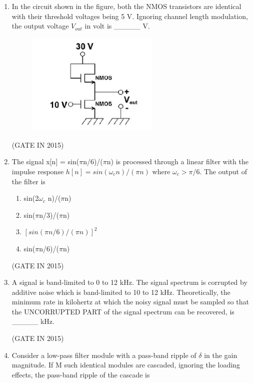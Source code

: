 \documentclass[journal]{IEEEtran}
\begin{document}
\begin{enumerate}
\item In the circuit shown in the figure, both the NMOS transistors are identical with their threshold voltages being 5 V. Ignoring channel length modulation, the output voltage $V_{out}$ in volt is \_\_\_\_\_ V.
\begin{figure}[H]
    \centering
      \includegraphics[width=0.6\textwidth]{28.png} 
      \caption{}
    \label{fig:fig28} 
\end{figure}
 \hfill(GATE IN 2015)

\item The signal x[n] = sin($\pi$n/6)/($\pi$n) is processed through a linear filter with the impulse response $h[n] = sin(\omega_c n)/(\pi n)$ where $\omega_c > \pi/6$. The output of the filter is

\begin{multicols}{2}
\begin{enumerate}
\item sin(2$\omega_c$ n)/($\pi$n)
\item sin($\pi$n/3)/($\pi$n)
\item $[sin(\pi n/6)/(\pi n)]^2$
\item sin($\pi$n/6)/($\pi$n)
\end{enumerate}
  \end{multicols} \hfill(GATE IN 2015)

\item A signal is band-limited to 0 to 12 kHz. The signal spectrum is corrupted by additive noise which is band-limited to 10 to 12 kHz. Theoretically, the minimum rate in kilohertz at which the noisy signal must be sampled so that the UNCORRUPTED PART of the signal spectrum can be recovered, is \_\_\_\_\_ kHz.

 \hfill(GATE IN 2015)

\item Consider a low-pass filter module with a pass-band ripple of $\delta$ in the gain magnitude. If M such identical modules are cascaded, ignoring the loading effects, the pass-band ripple of the cascade is


\end{enumerate}
\end{document}
